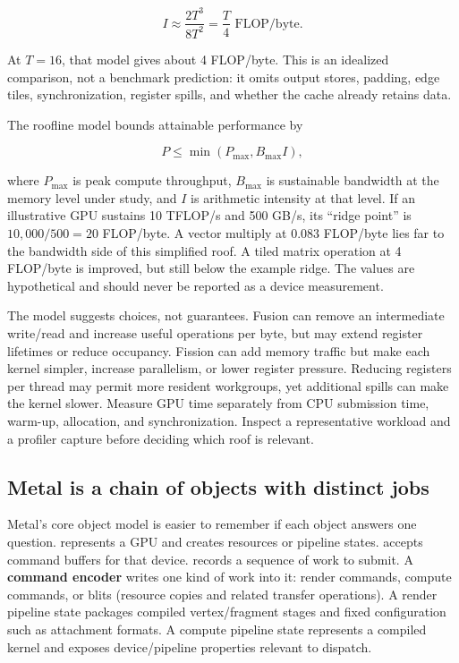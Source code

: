 \[
I\approx\frac{2T^3}{8T^2}=\frac{T}{4}\text{ FLOP/byte}.
\]

At \(T=16\), that model gives about 4 FLOP/byte. This is an idealized comparison, not a benchmark prediction: it omits output stores, padding, edge tiles, synchronization, register spills, and whether the cache already retains data.

The roofline model bounds attainable performance by

\[
P\le \min(P_{\max}, B_{\max} I),
\]

where \(P_{\max}\) is peak compute throughput, \(B_{\max}\) is sustainable bandwidth at the memory level under study, and \(I\) is arithmetic intensity at that level. If an illustrative GPU sustains 10 TFLOP/s and 500 GB/s, its ``ridge point'' is \(10{,}000/500=20\) FLOP/byte. A vector multiply at 0.083 FLOP/byte lies far to the bandwidth side of this simplified roof. A tiled matrix operation at 4 FLOP/byte is improved, but still below the example ridge. The values are hypothetical and should never be reported as a device measurement.

The model suggests choices, not guarantees. Fusion can remove an intermediate write/read and increase useful operations per byte, but may extend register lifetimes or reduce occupancy. Fission can add memory traffic but make each kernel simpler, increase parallelism, or lower register pressure. Reducing registers per thread may permit more resident workgroups, yet additional spills can make the kernel slower. Measure GPU time separately from CPU submission time, warm-up, allocation, and synchronization. Inspect a representative workload and a profiler capture before deciding which roof is relevant.

\subsection{Metal is a chain of objects with distinct jobs}\label{05-engine-i-ch019-metal-is-a-chain-of-objects-with-distinct-jobs}

\hypertarget{05-engine-i-ch019-metal-is-a-chain-of-objects-with-distinct-jobs}{}

Metal's core object model is easier to remember if each object answers one question.  represents a GPU and creates resources or pipeline states.  accepts command buffers for that device.  records a sequence of work to submit. A \textbf{command encoder} writes one kind of work into it: render commands, compute commands, or blits (resource copies and related transfer operations). A render pipeline state packages compiled vertex/fragment stages and fixed configuration such as attachment formats. A compute pipeline state represents a compiled kernel and exposes device/pipeline properties relevant to dispatch.

